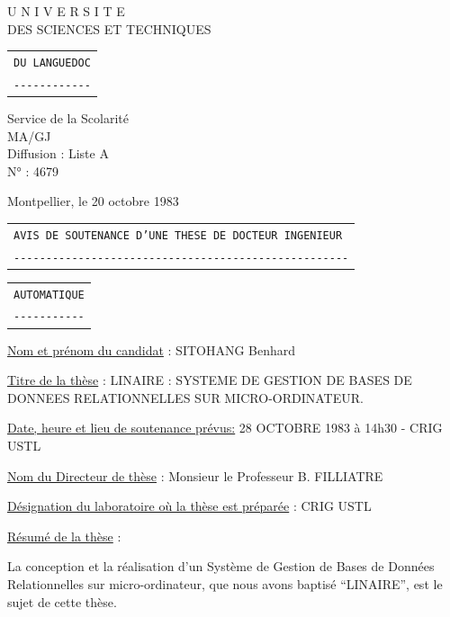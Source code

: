 
\begin{minipage}[c]{.43\linewidth}\centering
U N I V E R S I T E\\
DES SCIENCES ET TECHNIQUES\\
\begin{tabular}{@{}l@{}}
\texttt{DU LANGUEDOC}\\[-.6ex]
\texttt{-{}-{}-{}-{}-{}-{}-{}-{}-{}-{}-{}-}
\end{tabular}

Service de la Scolarité\\
MA/GJ\\
Diffusion : Liste A\\
N° : 4679
\end{minipage}\hfill
\begin{minipage}[c]{.54\linewidth}\raggedleft
Montpellier, le 20 octobre 1983
\end{minipage}


\begin{center}
\begin{tabular}{@{}l@{}}
\texttt{AVIS DE SOUTENANCE D'UNE THESE DE DOCTEUR INGENIEUR}\\[-.6ex]
\texttt{-{}-{}-{}-{}-{}-{}-{}-{}-{}-{}-{}-{}-{}-{}-{}-{}-{}-{}-{}-{}-{}-{}-{}-{}-{}-{}-{}-{}-{}-{}-{}-{}-{}-{}-{}-{}-{}-{}-{}-{}-{}-{}-{}-{}-{}-{}-{}-{}-{}-{}-{}-}
\end{tabular}

\begin{tabular}{@{}l@{}}
\texttt{AUTOMATIQUE}\\[-.6ex]
\texttt{-{}-{}-{}-{}-{}-{}-{}-{}-{}-{}-}
\end{tabular}
\end{center}

\uline{Nom et prénom du candidat} : SITOHANG Benhard

\uline{Titre de la thèse} : LINAIRE : SYSTEME DE GESTION DE BASES DE DONNEES RELATIONNELLES SUR MICRO-ORDINATEUR.

\uline{Date, heure et lieu de soutenance prévus:} 28 OCTOBRE 1983 à 14h30 - CRIG USTL

\uline{Nom du Directeur de thèse} : Monsieur le Professeur B. FILLIATRE

\uline{Désignation du laboratoire où la thèse est préparée} : CRIG USTL

\uline{Résumé de la thèse} :

La conception et la réalisation d'un Système de Gestion de Bases de Données Relationnelles sur micro-ordinateur, que nous avons baptisé ``LINAIRE'', est le sujet de cette thèse.

